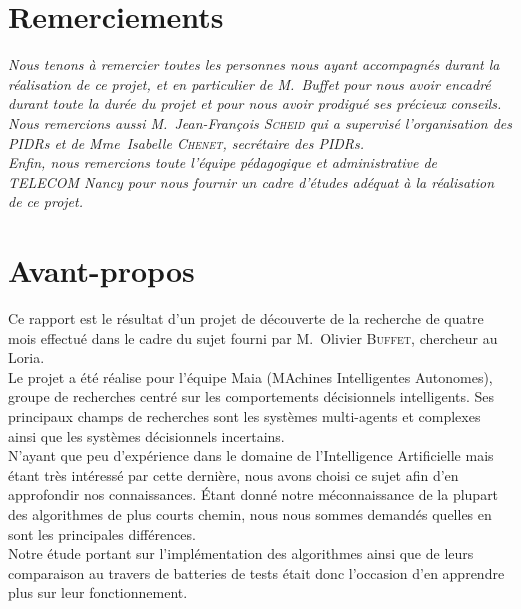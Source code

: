 \documentclass[pidr]{tnreport}
\begin{document}
  
\maketitle
{}


\clearpage
\makesecondtitle

\section*{Remerciements}

{\em
Nous tenons à remercier toutes les personnes nous ayant accompagnés durant la réalisation de ce projet, et en particulier de M.~Buffet pour nous avoir encadré durant toute la durée du projet et pour nous avoir prodigué ses précieux conseils. \\
Nous remercions aussi M.~Jean-François \textsc{Scheid} qui a supervisé l'organisation des PIDRs et de Mme~Isabelle \textsc{Chenet}, secrétaire des PIDRs. \\
Enfin, nous remercions toute l'équipe pédagogique et administrative de TELECOM Nancy pour nous fournir un cadre d'études adéquat à la réalisation de ce projet. \\
}

\clearpage

\section*{Avant-propos}
Ce rapport est le résultat d'un projet de découverte de la recherche de quatre mois effectué dans le cadre du sujet fourni par M.~Olivier \textsc{Buffet}, chercheur au Loria. \\
Le projet a été réalise pour l'équipe Maia (MAchines Intelligentes Autonomes), groupe de recherches centré sur les comportements décisionnels intelligents. Ses principaux champs de recherches sont les systèmes multi-agents et complexes ainsi que les systèmes décisionnels incertains. \\
N'ayant que peu d'expérience dans le domaine de l'Intelligence Artificielle mais étant très intéressé par cette dernière, nous avons choisi ce sujet afin d'en approfondir nos connaissances. Étant donné notre méconnaissance de la plupart des algorithmes de plus courts chemin, nous nous sommes demandés quelles en sont les principales différences. \\ 
Notre étude portant sur l'implémentation des algorithmes ainsi que de leurs comparaison au travers de batteries de tests était donc l'occasion d'en apprendre plus sur leur fonctionnement.
\end{document}
